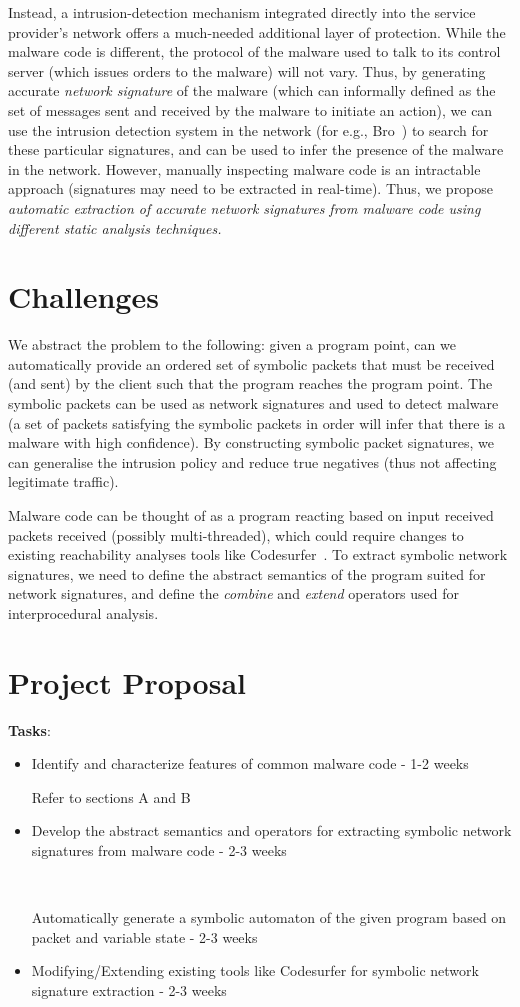 \documentclass[]{article}
\newcommand{\deleted}[1]{%
	\cbcolor{red}
	\begin{changebar}
		#1
	\end{changebar}%
}%
\newcommand{\added}[1]{%
	\cbcolor{green}
	\begin{changebar}
		#1
	\end{changebar}%
}%
\begin{document}
Instead, a intrusion-detection mechanism integrated 
directly into the service provider’s network offers a
much-needed additional layer of protection. While the malware
code is different, the protocol of the malware used to talk to its
control server (which issues orders to the malware) will not vary. 
Thus, by generating accurate \emph{network signature} of the malware (which
can informally defined as the set of messages sent and received by the malware to
initiate an action), we can use the intrusion detection system in the
network (for e.g., Bro~\cite{bro}) to search for these particular signatures,
and can be used to infer the presence of the malware in the network. However,
manually inspecting malware code is an intractable approach (signatures may 
need to be extracted in real-time). Thus, we propose \emph{automatic extraction 
of accurate network signatures from malware code using different static
analysis techniques.} 

\section{Challenges}
We abstract the problem to the following: given a program point,
can we automatically provide an ordered set of symbolic packets 
that must be received (and sent) by the client such that the program 
reaches the program point. The symbolic packets can be used as
network signatures and used to detect malware (a set of packets
satisfying the symbolic packets in order will infer that there 
is a malware with high confidence). By constructing symbolic packet
signatures, we can generalise the intrusion policy and reduce 
true negatives (thus not affecting legitimate traffic).

Malware code can be thought of as a program reacting based on input received
packets received (possibly multi-threaded), which
could require changes to existing reachability analyses tools 
like Codesurfer~\cite{codesurfer}. To extract symbolic network
signatures, we need to define the abstract semantics of the program
suited for network signatures, and define the \emph{combine} and 
\emph{extend} operators used for interprocedural analysis.

\section{Project Proposal}
\textbf{Tasks}:
\begin{itemize}
	\item Identify and characterize features of common malware code - 1-2 weeks
	\added{Refer to sections A and B}
	\item \deleted{Develop the abstract semantics and operators for extracting  
	symbolic network signatures from malware code - 2-3 weeks} \\
	\added{Automatically generate a symbolic automaton of the given program
		based on packet and variable state - 2-3 weeks}
	\item Modifying/Extending existing tools like Codesurfer for symbolic 
	network signature extraction - 2-3 weeks
\end{itemize}
\end{document}
